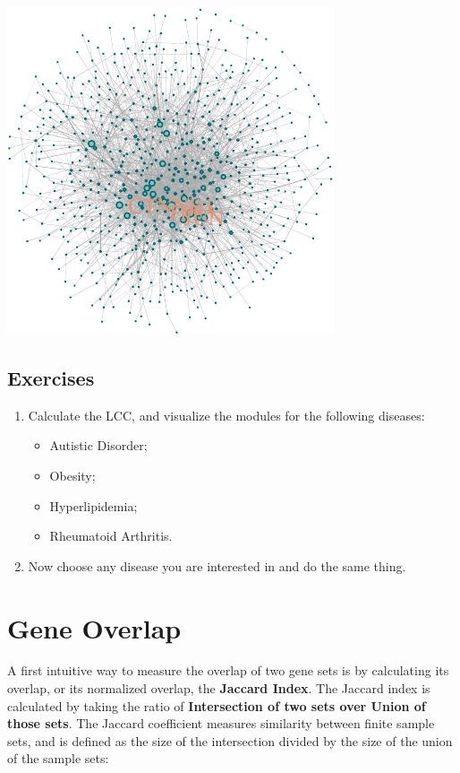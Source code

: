 \documentclass[
]{book}
\providecommand{\tightlist}{%
  \setlength{\itemsep}{0pt}\setlength{\parskip}{0pt}}
\begin{document}
\includegraphics{NetMed_files/figure-latex/unnamed-chunk-25-1.pdf}

\hypertarget{exercises-3}{%
\subsection{Exercises}\label{exercises-3}}

\begin{enumerate}
\def\labelenumi{\arabic{enumi}.}
\item
  Calculate the LCC, and visualize the modules for the following diseases:

  \begin{itemize}
  \tightlist
  \item
    Autistic Disorder;
  \item
    Obesity;
  \item
    Hyperlipidemia;
  \item
    Rheumatoid Arthritis.
  \end{itemize}
\item
  Now choose any disease you are interested in and do the same thing.
\end{enumerate}

\hypertarget{gene-overlap}{%
\section{Gene Overlap}\label{gene-overlap}}

A first intuitive way to measure the overlap of two gene sets is by calculating its overlap, or its normalized overlap, the \textbf{Jaccard Index}. The Jaccard index is calculated by taking the ratio of \textbf{Intersection of two sets over Union of those sets}. The Jaccard coefficient measures similarity between finite sample sets, and is defined as the size of the intersection divided by the size of the union of the sample sets:
\end{document}
